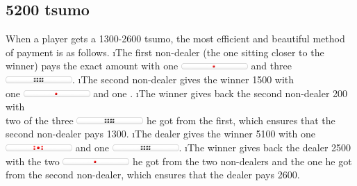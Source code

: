 \subsection*{5200 {\jap tsumo}}
When a player gets a 1300-2600 {\jap tsumo}, the most efficient and beautiful method of payment is as follows.
\be
\i The first non-dealer (the one sitting closer to the winner) pays the exact amount with one \includegraphics[width=1in]{figs/tenbou1000} and three \includegraphics[width=1in]{figs/tenbou100}.
\i The second non-dealer gives the winner 1500 with\\
one \includegraphics[width=1in]{figs/tenbou1000} and one .
\i The winner gives back the second non-dealer 200 with\\
two of the three \includegraphics[width=1in]{figs/tenbou100} he got from the first,
which ensures that the second non-dealer pays 1300.
\i The dealer gives the winner 5100 with one \includegraphics[width=1in]{figs/tenbou5000} and one \includegraphics[width=1in]{figs/tenbou100}.
\i The winner gives back the dealer 2500 with the two \includegraphics[width=1in]{figs/tenbou1000} he got from the two non-dealers and the one  he got from the second non-dealer, which ensures that the dealer pays 2600.
